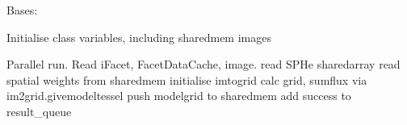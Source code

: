 \documentclass[letterpaper,10pt,english]{sphinxmanual}
\begin{document}
\begin{fulllineitems}
\label{\detokenize{api/killMS.Predict:killMS.Predict.ClassImageSM2.Worker}}
\pysigstartsignatures
{}
\pysigstopsignatures
\sphinxAtStartPar
Bases: 

\sphinxAtStartPar
Initialise class variables, including shared\sphinxhyphen{}mem images

\begin{fulllineitems}
\label{\detokenize{api/killMS.Predict:killMS.Predict.ClassImageSM2.Worker.run}}
\pysigstartsignatures
{}
\pysigstopsignatures
\sphinxAtStartPar
Parallel run. Read iFacet, FacetDataCache, image.
read SPHe sharedarray
read spatial weights from sharedmem
initialise imtogrid
calc grid, sumflux via im2grid.givemodeltessel
push modelgrid to sharedmem
add success to result\_queue

\end{fulllineitems}


\begin{fulllineitems}
\label{\detokenize{api/killMS.Predict:killMS.Predict.ClassImageSM2.Worker.shutdown}}
\pysigstartsignatures
{}
\pysigstopsignatures
\end{fulllineitems}


\end{fulllineitems}
\end{document}

